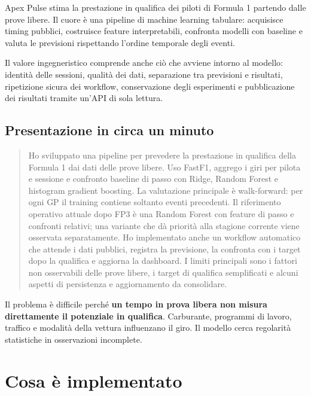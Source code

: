 \documentclass[11pt,a4paper]{article}
\begin{document}
Apex Pulse stima la prestazione in qualifica dei piloti di Formula 1 partendo dalle prove libere. Il cuore è una pipeline di machine learning tabulare: acquisisce timing pubblici, costruisce feature interpretabili, confronta modelli con baseline e valuta le previsioni rispettando l'ordine temporale degli eventi.

Il valore ingegneristico comprende anche ciò che avviene intorno al modello: identità delle sessioni, qualità dei dati, separazione tra previsioni e risultati, ripetizione sicura dei workflow, conservazione degli esperimenti e pubblicazione dei risultati tramite un'API di sola lettura.

\subsection{Presentazione in circa un minuto}\label{presentazione-in-circa-un-minuto}

\begin{quote}
Ho sviluppato una pipeline per prevedere la prestazione in qualifica della Formula 1 dai dati delle prove libere. Uso FastF1, aggrego i giri per pilota e sessione e confronto baseline di passo con Ridge, Random Forest e histogram gradient boosting. La valutazione principale è walk-forward: per ogni GP il training contiene soltanto eventi precedenti. Il riferimento operativo attuale dopo FP3 è una Random Forest con feature di passo e confronti relativi; una variante che dà priorità alla stagione corrente viene osservata separatamente. Ho implementato anche un workflow automatico che attende i dati pubblici, registra la previsione, la confronta con i target dopo la qualifica e aggiorna la dashboard. I limiti principali sono i fattori non osservabili delle prove libere, i target di qualifica semplificati e alcuni aspetti di persistenza e aggiornamento da consolidare.
\end{quote}

Il problema è difficile perché \textbf{un tempo in prova libera non misura direttamente il potenziale in qualifica}. Carburante, programmi di lavoro, traffico e modalità della vettura influenzano il giro. Il modello cerca regolarità statistiche in osservazioni incomplete.

\section{Cosa è implementato}\label{cosa-uxe8-implementato}
\end{document}
